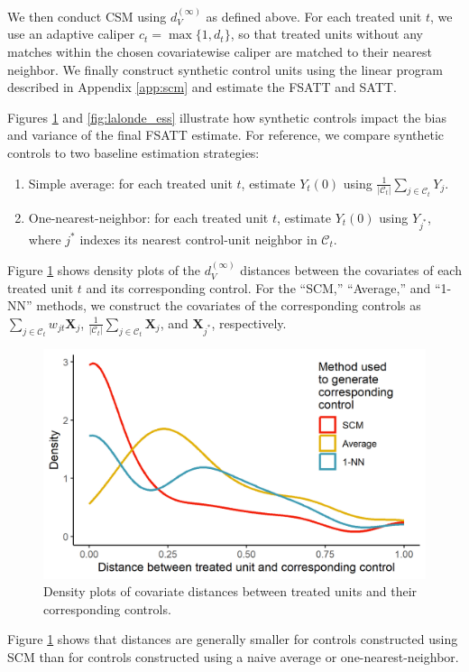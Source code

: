 \documentclass{article}
\newcommand{\Xj}{\mathbf{X}_j}
\newcommand{\Ct}{\mathcal{C}_{t}}
\begin{document}
We then conduct CSM using $d_V^{(\infty)}$ as defined above.
For each treated unit $t$, we use an adaptive caliper $c_t = \max \{1, d_t\}$, so that treated units without any matches within the chosen covariatewise caliper are matched to their nearest neighbor.
We finally construct synthetic control units using the linear program described in Appendix \ref{app:scm} and estimate the FSATT and SATT.

Figures \ref{fig:lalonde_dist} and \ref{fig:lalonde_ess} illustrate how synthetic controls impact the bias and variance of the final FSATT estimate.
For reference, we compare synthetic controls to two baseline estimation strategies: 
\begin{enumerate}
    \item Simple average: for each treated unit $t$, estimate $Y_t(0)$ using $\frac{1}{|\Ct|} \sum_{j \in \Ct} Y_j$.
    \item One-nearest-neighbor: for each treated unit $t$, estimate $Y_t(0)$ using $Y_{j^*}$, where $j^*$ indexes its nearest control-unit neighbor in $\Ct$.
\end{enumerate}

Figure \ref{fig:lalonde_dist} shows density plots of the $d_V^{(\infty)}$ distances between the covariates of each treated unit $t$ and its corresponding control.
For the  ``SCM,'' ``Average,'' and ``1-NN'' methods, we construct the covariates of the corresponding controls as $\sum_{j \in \Ct} w_{jt} \Xj$, $\frac{1}{|\Ct|} \sum_{j \in \Ct} \Xj$, and $\mathbf{X}_{j^*}$, respectively.
\begin{figure}[ht]
    \centering
    \includegraphics{writeup/figures/lalonde_dist.png}
    \caption{Density plots of covariate distances between treated units and their corresponding controls.}
    \label{fig:lalonde_dist}
\end{figure}
Figure \ref{fig:lalonde_dist} shows that distances are generally smaller for controls constructed using SCM than for controls constructed using a naive average or one-nearest-neighbor.
\end{document}
